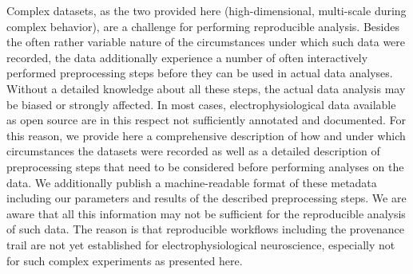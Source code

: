Complex datasets, as the two provided here (high-dimensional, multi-scale during complex behavior), are a challenge for performing reproducible analysis. Besides the often rather variable nature of the circumstances under which such data were recorded, the data additionally experience a number of often interactively performed preprocessing steps before they can be used in actual data analyses. Without a detailed knowledge about all these steps, the actual data analysis may be biased or strongly affected. In most cases, electrophysiological data available as open source are in this respect not sufficiently annotated and documented. For this reason, we provide here a comprehensive description of how and under which circumstances the datasets were recorded as well as a detailed description of preprocessing steps that need to be considered before performing analyses on the data. We additionally publish a machine-readable format of these metadata including our parameters and results of the described preprocessing steps. We are aware that all this information may not be sufficient for the reproducible analysis of such data. The reason is that reproducible workflows including the provenance trail are not yet established for electrophysiological neuroscience, especially not for such complex experiments as presented here.

